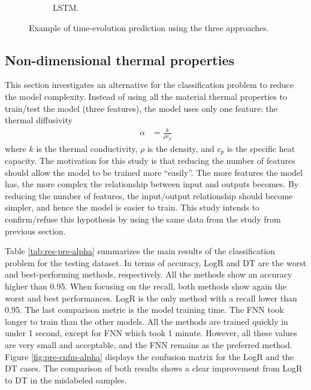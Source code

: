 \begin{figure}[htbp!]
\begin{subfigure}[b]{0.49\textwidth}
    \caption{LSTM.}
  \end{subfigure}
  \caption{Example of time-evolution prediction using the three approaches.}
  \label{fig:t-evol}
\end{figure}


\subsection{Non-dimensional thermal properties}

This section investigates an alternative for the classification problem to reduce the model complexity.
Instead of using all the material thermal properties to train/test the model (three features), the model uses only one feature: the thermal diffusivity
\begin{align}
\alpha &= \frac{k}{\rho c_p}
\end{align}
where $k$ is the thermal conductivity, $\rho$ is the density, and $c_p$ is the specific heat capacity.
The motivation for this study is that reducing the number of features should allow the model to be trained more ``easily''.
The more features the model has, the more complex the relationship between input and outputs becomes.
By reducing the number of features, the input/output relationship should become simpler, and hence the model is easier to train.
This study intends to confirm/refuse this hypothesis by using the same data from the study from previous section.

Table \ref{tab:res-pre-alpha} summarizes the main results of the classification problem for the testing dataset.
In terms of accuracy, LogR and DT are the worst and best-performing methods, respectively.
All the methods show an accuracy higher than 0.95.
When focusing on the recall, both methods show again the worst and best performances.
LogR is the only method with a recall lower than 0.95.
The last comparison metric is the model training time.
The FNN took longer to train than the other models.
All the methods are trained quickly in under 1 second, except for FNN which took 1 minute.
However, all these values are very small and acceptable, and the FNN remains as the preferred method.
Figure \ref{fig:pre-cnfm-alpha} displays the confusion matrix for the LogR and the DT cases.
The comparison of both results shows a clear improvement from LogR to DT in the mislabeled samples.


